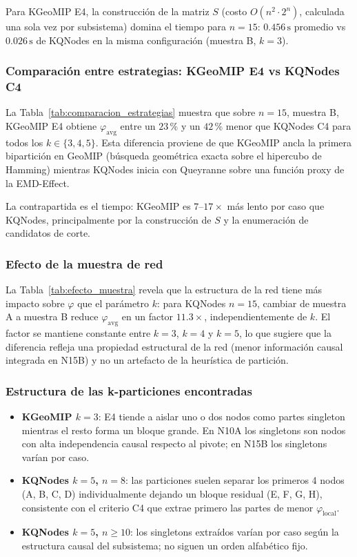 Para KGeoMIP E4, la construcción de la matriz $S$ (costo $O(n^2 \cdot 2^n)$,
calculada una sola vez por subsistema) domina el tiempo para $n=15$:
$0.456\,\text{s}$ promedio vs $0.026\,\text{s}$ de KQNodes en la misma
configuración (muestra B, $k=3$).

\subsubsection*{Comparación entre estrategias: KGeoMIP E4 vs KQNodes C4}

La Tabla~\ref{tab:comparacion_estrategias} muestra que sobre $n=15$,
muestra B, KGeoMIP E4 obtiene $\varphi_{\mathrm{avg}}$ entre un $23$\,\%
y un $42$\,\% menor que KQNodes C4 para todos los $k \in \{3,4,5\}$.
Esta diferencia proviene de que KGeoMIP ancla la primera bipartición en
GeoMIP (búsqueda geométrica exacta sobre el hipercubo de Hamming) mientras
KQNodes inicia con Queyranne sobre una función proxy de la EMD-Effect.

La contrapartida es el tiempo: KGeoMIP es $7$--$17\times$ más lento
por caso que KQNodes, principalmente por la construcción de $S$ y la
enumeración de candidatos de corte.

\subsubsection*{Efecto de la muestra de red}

La Tabla~\ref{tab:efecto_muestra} revela que la estructura de la red
tiene más impacto sobre $\varphi$ que el parámetro $k$:
para KQNodes $n=15$, cambiar de muestra A a muestra B reduce
$\varphi_{\mathrm{avg}}$ en un factor $11.3\times$, independientemente de $k$.
El factor se mantiene constante entre $k=3$, $k=4$ y $k=5$, lo que sugiere
que la diferencia refleja una propiedad estructural de la red
(menor información causal integrada en N15B) y no un artefacto de la
heurística de partición.

\subsubsection*{Estructura de las k-particiones encontradas}

\begin{itemize}
  \item \textbf{KGeoMIP $k=3$}: E4 tiende a aislar uno o dos nodos como
        partes singleton mientras el resto forma un bloque grande.
        En N10A los singletons son nodos con alta independencia causal
        respecto al pivote; en N15B los singletons varían por caso.

  \item \textbf{KQNodes $k=5$, $n=8$}: las particiones suelen separar
        los primeros 4 nodos (A, B, C, D) individualmente dejando un
        bloque residual (E, F, G, H), consistente con el criterio C4
        que extrae primero las partes de menor $\varphi_{\mathrm{local}}$.

  \item \textbf{KQNodes $k=5$, $n \geq 10$}: los singletons extraídos
        varían por caso según la estructura causal del subsistema;
        no siguen un orden alfabético fijo.
\end{itemize}

